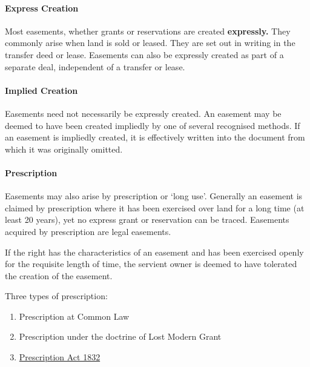 \documentclass[
]{article}
\providecommand{\tightlist}{%
  \setlength{\itemsep}{0pt}\setlength{\parskip}{0pt}}
\begin{document}
\hypertarget{express-creation}{%
\paragraph{Express Creation}\label{express-creation}}

Most easements, whether grants or reservations are created
\textbf{expressly.} They commonly arise when land is sold or leased.
They are set out in writing in the transfer deed or lease. Easements can
also be expressly created as part of a separate deal, independent of a
transfer or lease.

\hypertarget{implied-creation}{%
\paragraph{Implied Creation}\label{implied-creation}}

Easements need not necessarily be expressly created. An easement may be
deemed to have been created impliedly by one of several recognised
methods. If an easement is impliedly created, it is effectively written
into the document from which it was originally omitted.

\hypertarget{prescription}{%
\paragraph{Prescription}\label{prescription}}

Easements may also arise by prescription or `long use'. Generally an
easement is claimed by prescription where it has been exercised over
land for a long time (at least 20 years), yet no express grant or
reservation can be traced. Easements acquired by prescription are legal
easements.

If the right has the characteristics of an easement and has been
exercised openly for the requisite length of time, the servient owner is
deemed to have tolerated the creation of the easement.

Three types of prescription:

\begin{enumerate}
\def\labelenumi{\arabic{enumi}.}
\tightlist
\item
  Prescription at Common Law
\item
  Prescription under the doctrine of Lost Modern Grant
\item
  \href{https://www.legislation.gov.uk/ukpga/Will4/2-3/71/contents}{Prescription
  Act 1832}
\end{enumerate}
\end{document}
